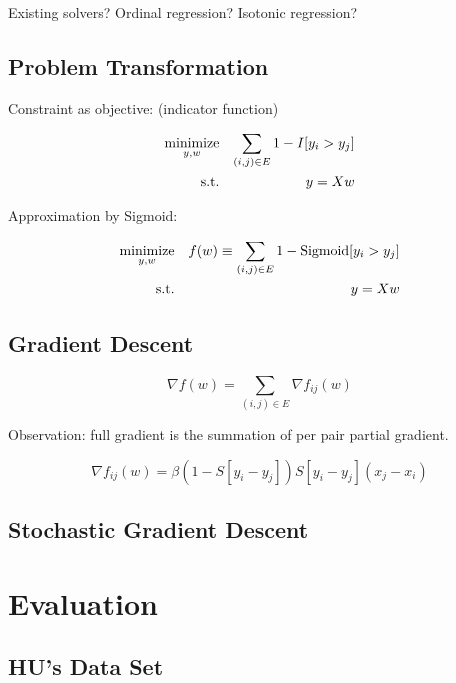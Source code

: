 \documentclass{sig-alternate}
\begin{document}
Existing solvers?
Ordinal regression?
Isotonic regression?

\subsection{Problem Transformation}
\label{sec:Problem Transformation}

Constraint as objective: (indicator function)

\begin{eqnarray}
	\operatorname*{minimize}_{y,w} && \sum_{(i,j) \in E} 1 - I[y_i > y_j] \\
	\text{s.t.} && y = Xw
\end{eqnarray}

Approximation by Sigmoid:

\begin{eqnarray}
	\operatorname*{minimize}_{y,w} && f(w) \equiv \sum_{(i,j) \in E} 1 - \text{Sigmoid}[y_i > y_j] \\
	\text{s.t.} && y = Xw
\end{eqnarray}


\subsection{Gradient Descent}
\label{sec:Gradient Descent}

\begin{equation}
	\nabla f(w) = \sum_{(i,j) \in E} \nabla f_{ij}(w) 
\end{equation}

Observation: full gradient is the summation of
per pair partial gradient. 

\begin{equation}
	\nabla f_{ij}(w) = \beta (1-S[y_i - y_j])S[y_i-y_j](x_j-x_i)
\end{equation}

\subsection{Stochastic Gradient Descent}
\label{sec:Stochastic Gradient Descent}


\section{Evaluation}
\label{sec:Evaluation}

\subsection{HU's Data Set}
\label{sec:HU's Data Set}
\end{document}

